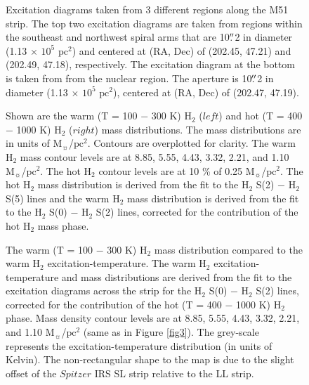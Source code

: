\documentclass[manuscript]{aastex}
\begin{document}
\clearpage

\begin{figure}
\caption{Excitation diagrams taken from 3 different regions along the M51 strip.  The top two excitation diagrams are taken from regions within the southeast and northwest spiral arms that are 10$\mbox{$.\!\!^{\prime\prime}$}$2 in diameter (1.13 $\times$ $\mathrm{10^5}$ $\mathrm{pc^2}$) and centered at (RA, Dec) of (202.45, 47.21) and (202.49, 47.18), respectively. The excitation diagram at the bottom is taken from from the nuclear region.  The aperture is 10$\mbox{$.\!\!^{\prime\prime}$}$2 in diameter (1.13 $\times$ $\mathrm{10^5}$ $\mathrm{pc^2}$), centered at (RA, Dec) of (202.47, 47.19).}
\end{figure}

\clearpage

\begin{figure}
\caption{Shown are the warm (T = 100 $-$ 300 K) $\mathrm{H_2}$ ($left$) and hot (T = 400 $-$ 1000 K) $\mathrm{H_2}$ ($right$) mass distributions.  The mass distributions are in units of $\mathrm{M_\sun}$/$\mathrm{pc^2}$.   Contours are overplotted for clarity.  The warm $\mathrm{H_2}$ mass contour levels are at 8.85, 5.55, 4.43, 3.32, 2.21, and 1.10 $\mathrm{M_\sun}$/$\mathrm{pc^2}$.  The hot $\mathrm{H_2}$ contour levels are at 10 \% of 0.25 $\mathrm{M_\sun}$/$\mathrm{pc^2}$.  The hot $\mathrm{H_2}$ mass distribution is derived from the fit to the $\mathrm{H_2}$ S(2) $-$ $\mathrm{H_2}$ S(5) lines and the warm $\mathrm{H_2}$ mass distribution is derived from the fit to the $\mathrm{H_2}$ S(0) $-$ $\mathrm{H_2}$ S(2) lines, corrected for the contribution of the hot $\mathrm{H_2}$ mass phase.}
\end{figure}

\clearpage

\begin{figure}
\caption{The warm (T = 100 $-$ 300 K) $\mathrm{H_2}$ mass distribution compared 
to the warm $\mathrm{H_2}$ excitation-temperature.  The warm $\mathrm{H_2}$ 
excitation-temperature and mass distributions are derived from the fit to the excitation 
diagrams across the strip for the $\mathrm{H_2}$ S(0) $-$ $\mathrm{H_2}$ S(2) lines, 
corrected for the contribution of the hot (T = 400 $-$ 1000 K) $\mathrm{H_2}$ phase.  
Mass density contour levels are at 8.85, 5.55, 4.43, 3.32, 2.21, and 1.10 
$\mathrm{M_\sun}$/$\mathrm{pc^2}$ (same as in Figure \ref{fig3}). 
The grey-scale represents the excitation-temperature distribution (in units of Kelvin).  
The non-rectangular shape to the map is due to the slight offset of the $Spitzer$ IRS SL 
strip relative to the LL strip.}
\end{figure}
\end{document}

